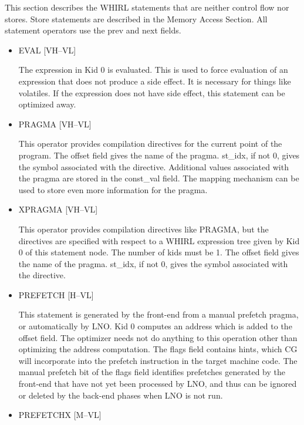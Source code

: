 This section describes the WHIRL statements that are neither
control flow nor stores. Store statements are described in the Memory
Access Section. All statement operators use the prev and next
fields. 
\begin{itemize}

\item
{}%
EVAL \hfill [VH--VL]

The expression in Kid 0 is evaluated. This is used to force evaluation
of an expression that does not produce a side effect. It is necessary
for things like volatiles. If the expression does not have side effect,
this statement can be optimized away.

\item
{}%
PRAGMA \hfill [VH--VL]

This operator provides compilation directives for the current point
of the program. The offset field gives the name of the pragma.
st\_idx, if not 0,
gives the symbol associated with the directive. Additional values
associated with the pragma are stored in the const\_val field. The
mapping mechanism can be used to store even more information for
the pragma. 

\item
{}%
XPRAGMA \hfill [VH--VL]

This operator provides compilation directives like
%
PRAGMA, but the
directives are specified with respect to a WHIRL expression tree
given by
Kid 0 of this statement node. The number of kids must be 1. The
offset field gives the name of the pragma. st\_idx, if not 0, gives
the symbol associated with the directive. 

\item
{}%
PREFETCH \hfill \hfill [H--VL]

This statement is generated by the front-end from a manual
prefetch pragma, or automatically by LNO. Kid 0 computes an address
which is added to the offset field. The optimizer needs not do anything to
this operation other than optimizing the address computation. The
flags field contains hints, which CG will incorporate into the
prefetch instruction in the target machine code. The manual prefetch
bit of the flags field identifies prefetches generated by the
front-end that have not yet been processed by LNO, and thus can
be ignored or deleted by the back-end phases when LNO is not run.


\item
{}%
PREFETCHX \hfill [M--VL]


\end{itemize}
